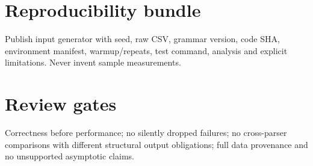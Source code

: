 \documentclass[11pt,letterpaper]{article}
\begin{document}
\section{Reproducibility bundle}
Publish input generator with seed, raw CSV, grammar version, code SHA, environment manifest, warmup/repeats, test command, analysis and explicit limitations. Never invent sample measurements.\section{Review gates}
Correctness before performance; no silently dropped failures; no cross-parser comparisons with different structural output obligations; full data provenance and no unsupported asymptotic claims.
\end{document}
